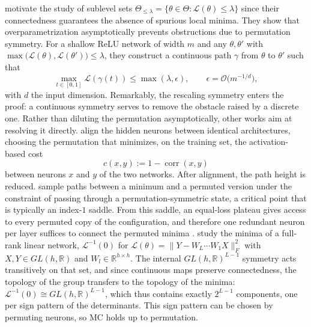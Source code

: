 \documentclass[mathematics,review,submit,moreauthors]{Definitions/mdpi}
\begin{document}
\citet{freeman2017} motivate the study of sublevel sets $\Theta_{\le\lambda}=\{\theta\in\Theta:\mathcal{L}(\theta)\le\lambda\}$ since their connectedness guarantees the absence of spurious local minima.
They show that overparametrization asymptotically prevents obstructions due to permutation symmetry.
For a shallow ReLU network of width $m$ and any $\theta,\theta'$ with $\max\big(\mathcal{L}(\theta),\mathcal{L}(\theta')\big)\le\lambda$, they construct a continuous path $\gamma$ from $\theta$ to $\theta'$ such that
\begin{equation*}
    \max_{t\in[0,1]}\mathcal{L}(\gamma(t))\le\max(\lambda,\epsilon),\qquad \epsilon=\mathcal{O}\big(m^{-1/d}\big),
\end{equation*}
with $d$ the input dimension.
Remarkably, the rescaling symmetry enters the proof: a continuous symmetry serves to remove the obstacle raised by a discrete one.
Rather than diluting the permutation asymptotically, other works aim at resolving it directly.
\citet{tatro2020} align the hidden neurons between identical architectures, choosing the permutation that minimizes, on the training set, the activation-based cost
\begin{equation*}
    c(x,y):=1-\operatorname{corr}(x,y)
\end{equation*}
between neurons $x$ and $y$ of the two networks.
After alignment, the path height is reduced.
\citet{brea2019} sample paths between a minimum and a permuted version under the constraint of passing through a permutation-symmetric state, a critical point that is typically an index-$1$ saddle.
From this saddle, an equal-loss plateau gives access to every permuted copy of the configuration, and therefore one redundant neuron per layer suffices to connect the permuted minima \citep{brea2019,simsek2021}.
\citet{zhao2025a} study the minima of a full-rank linear network, $\mathcal{L}^{-1}(0)$ for $\mathcal{L}(\theta)=\lVert Y-W_L\cdots W_1X\rVert_F^2$ with $X,Y\in GL(h,\mathbb{R})$ and $W_l\in\mathbb{R}^{h\times h}$.
The internal $GL(h,\mathbb{R})^{L-1}$ symmetry acts transitively on that set, and since continuous maps preserve connectedness, the topology of the group transfers to the topology of the minima: $\mathcal{L}^{-1}(0)\cong GL(h,\mathbb{R})^{L-1}$, which thus contains exactly $2^{L-1}$ components, one per sign pattern of the determinants.
This sign pattern can be chosen by permuting neurons, so MC holds up to permutation.
\end{document}
